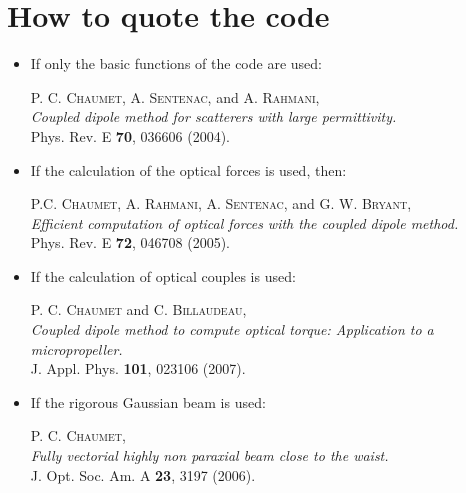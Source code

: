 \section{How to quote the code}

\begin{itemize}

\item If only the basic functions of the code are used:

P. C. {\textsc{Chaumet}}, A. {\textsc{Sentenac}}, and
A. {\textsc{Rahmani}}, \\{\it Coupled dipole method for scatterers
  with large permittivity.}\\
Phys. Rev. E {\bf 70}, 036606 (2004).

\item If the calculation of the optical forces is used, then:

P.C. {\textsc{Chaumet}}, A. {\textsc{Rahmani}},
A. {\textsc{Sentenac}}, and G. W. {\textsc{Bryant}},\\ {\it Efficient
  computation of optical forces with the coupled dipole method.}\\
Phys. Rev. E {\bf 72}, 046708 (2005).

\item If the calculation of optical couples is used:

P. C. {\textsc{Chaumet}} and C. {\textsc{Billaudeau}},\\ {\it Coupled
  dipole method to compute optical torque: Application to a
  micropropeller.}\\
J. Appl. Phys. {\bf 101}, 023106 (2007).

\item If the rigorous Gaussian beam is used:

P. C. {\textsc{Chaumet}},\\ {\it Fully vectorial highly non
  paraxial beam close to the waist.}\\
J. Opt. Soc. Am. A {\bf 23}, 3197 (2006).

\end{itemize}
